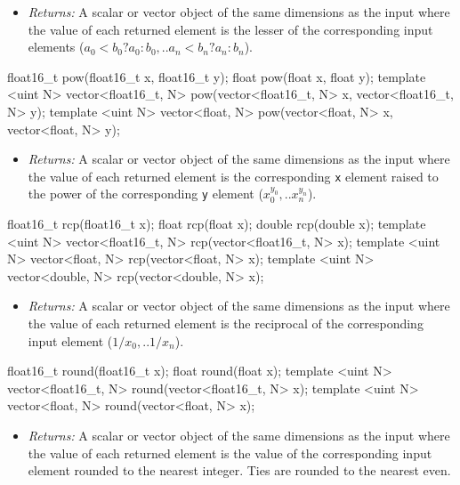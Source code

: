 \begin{itemize}
  \item \textit{Returns:} A scalar or vector object of the same dimensions as
  the input where the value of each returned element is the lesser of the
  corresponding input elements (\(a_0 < b_0 ? a_0 : b_0, .. a_n < b_n ? a_n :
  b_n\)).
\end{itemize}

\begin{HLSL}
float16_t pow(float16_t x, float16_t y);
float pow(float x, float y);
template <uint N>
vector<float16_t, N> pow(vector<float16_t, N> x, vector<float16_t, N> y);
template <uint N> vector<float, N> pow(vector<float, N> x, vector<float, N> y);
\end{HLSL}

\begin{itemize}
  \item \textit{Returns:} A scalar or vector object of the same dimensions as
  the input where the value of each returned element is the corresponding
  \texttt{x} element raised to the power of the corresponding \texttt{y} element
  (\(x_0^{y_0}, .. x_n^{y_n}\)).
\end{itemize}

\begin{HLSL}
float16_t rcp(float16_t x);
float rcp(float x);
double rcp(double x);
template <uint N> vector<float16_t, N> rcp(vector<float16_t, N> x);
template <uint N> vector<float, N> rcp(vector<float, N> x);
template <uint N> vector<double, N> rcp(vector<double, N> x);
\end{HLSL}

\begin{itemize}
  \item \textit{Returns:} A scalar or vector object of the same dimensions as
  the input where the value of each returned element is the reciprocal of the
  corresponding input element (\(1/x_0, .. 1/x_n\)).
\end{itemize}

\begin{HLSL}
float16_t round(float16_t x);
float round(float x);
template <uint N> vector<float16_t, N> round(vector<float16_t, N> x);
template <uint N> vector<float, N> round(vector<float, N> x);
\end{HLSL}

\begin{itemize}
  \item \textit{Returns:} A scalar or vector object of the same dimensions as
  the input where the value of each returned element is the value of the
  corresponding input element rounded to the nearest integer. Ties are rounded
  to the nearest even.
\end{itemize}

